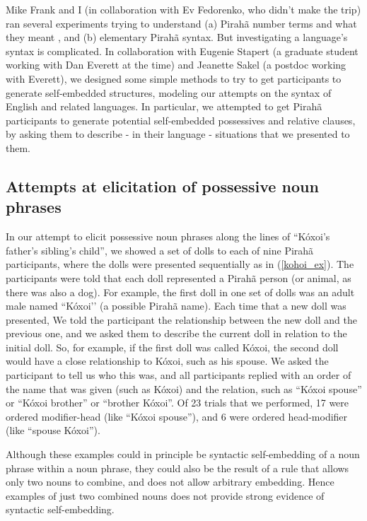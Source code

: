 \documentclass{article}
\newcommand{\exref}[1]{(\ref{#1})}
\begin{document}
Mike Frank and I (in collaboration with Ev Fedorenko, who didn’t make the trip) ran several experiments trying to understand (a) Pirahã number terms and what they meant \citep{frank2008language}, and (b) elementary Pirahã syntax. But investigating a language’s syntax is complicated.  In collaboration with Eugenie Stapert (a graduate student working with Dan Everett at the time) and Jeanette Sakel (a postdoc working with Everett), we designed some simple methods to try to get participants to generate self-embedded structures, modeling our attempts on the syntax of English and related languages. In particular, we attempted to get Pirahã participants to generate potential self-embedded possessives and relative clauses, by asking them to describe - in their language - situations that we presented to them.

\subsection{Attempts at elicitation of possessive noun phrases}

In our attempt to elicit possessive noun phrases along the lines of ``Kóxoi’s father’s sibling’s child'', we showed a set of dolls to each of nine Pirahã participants, where the dolls were presented sequentially as in \exref{kohoi_ex}. The participants were told that each doll represented a Pirahã person (or animal, as there was also a dog). For example, the first doll in one set of dolls was an adult male named ``Kóxoi’' (a possible Pirahã name). Each time that a new doll was presented, We told the participant the relationship between the new doll and the previous one, and we asked them to describe the current doll in relation to the initial doll.  So, for example, if the first doll was called Kóxoi, the second doll would have a close relationship to Kóxoi, such as his spouse. We asked the participant to tell us who this was, and all participants  replied with an order of the name that was given (such as Kóxoi) and the relation, such as ``Kóxoi spouse'' or ``Kóxoi brother'' or ``brother Kóxoi''. Of 23 trials that we performed, 17 were ordered modifier-head (like ``Kóxoi spouse''), and 6 were ordered head-modifier (like ``spouse Kóxoi'').

Although these examples could in principle be syntactic self-embedding of a noun phrase within a noun phrase, they could also be the result of a rule that allows only two nouns to combine, and does not allow arbitrary embedding.  Hence examples of just two combined nouns does not provide strong evidence of syntactic self-embedding.
\end{document}
